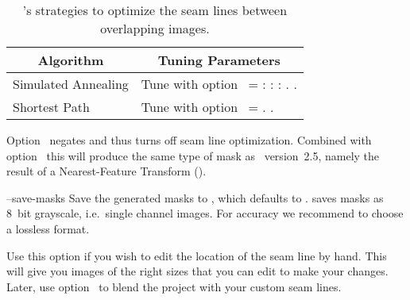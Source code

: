 \begin{codelist}
  \begin{table}
    \begin{tabular}{p{.35\linewidth}p{.55\linewidth}}
      \hline
      \multicolumn{1}{c|}{Algorithm} &
      \multicolumn{1}{c}{Tuning Parameters} \\
      \hline\extraheadingsep
      Simulated Annealing & Tune with option~\option{--anneal} = \metavar{TAU} :
      \metavar{DELTA-E-MAX} : \metavar{DELTA-E-MIN} : \metavar{K-MAX}.
      \uref{\wikipediasimulatedannealing}{Simulated-Annealing}.  \fixme{Explain
        Simulated-Annealing!} \\
      \propername{Dijkstra} Shortest Path & Tune with option~\option{--dijkstra} =
      \metavar{RADIUS}.  \uref{\wikipediadijkstraalgorithm}{\propername{Dijkstra} algorithm}.
      \fixme{Explain \propername{Dijkstra} algorithm!}
    \end{tabular}

    \caption[Optimizer strategies]{\label{tab:optimizer-strategies}%
      \App{}'s strategies to optimize the seam lines between overlapping images.}
  \end{table}

  Option~ negates
   and thus turns off seam line optimization.  Combined with
  option~ this will produce the same type of
  mask as \App{}~version~2.5, namely the result of a Nearest-Feature Transform ().


  \label{opt:save-masks}%
\item[--save-masks\optional{=\metavar{IMAGE-TEMPLATE}}]\itemend
  Save the generated masks to , which defaults to
  \mbox{}.  \App{} saves masks as 8~bit grayscale,
  i.e.\ single channel images.  For accuracy we recommend to choose a lossless format.

  Use this option if you wish to edit the location of the seam line by hand.  This will give you
  images of the right sizes that you can edit to make your changes.  Later, use
  option~ to blend the project with your
  custom seam lines.


\end{codelist}
